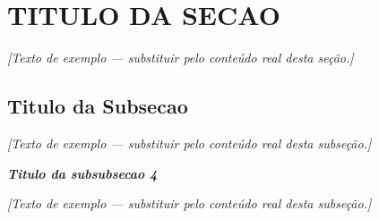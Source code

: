 \section{TITULO DA SECAO}\label{sec:resultados}
\textit{[Texto de exemplo --- substituir pelo conteúdo real desta seção.]}

\subsection{Titulo da Subsecao}\label{subsec:resultados}
\textit{[Texto de exemplo --- substituir pelo conteúdo real desta subseção.]}

\noindent\textbf{\textit{Titulo da subsubsecao 4}}

\textit{[Texto de exemplo --- substituir pelo conteúdo real desta subseção.]}
